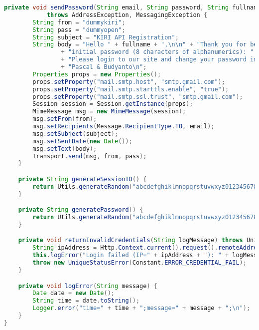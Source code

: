 \begin{lstlisting}[language=Java,basicstyle=\tiny,caption=models/AuthenticationManager.java,label={lst:authenticationmanager.java}]
	private void sendPassword(String email, String password, String fullname)
			throws AddressException, MessagingException {
		String from = "dummykiri";
		String pass = "dummyopen"; 
		String subject = "KIRI API Registration";
		String body = "Hello " + fullname + ",\n\n" + "Thank you for becoming KIRI Friends. Please find below your\n"
				+ "initial password (8 characters of alphanumerics): " + password + "\n"
				+ "Please login to our site and change your password immediately.\n\n" + "Sincerely yours,\n"
				+ "Pascal & Budyanto\n";
		Properties props = new Properties();
		props.setProperty("mail.smtp.host", "smtp.gmail.com");
		props.setProperty("mail.smtp.starttls.enable", "true");
		props.setProperty("mail.smtp.ssl.trust", "smtp.gmail.com");
		Session session = Session.getInstance(props);
		MimeMessage msg = new MimeMessage(session);
		msg.setFrom(from);
		msg.setRecipients(Message.RecipientType.TO, email);
		msg.setSubject(subject);
		msg.setSentDate(new Date());
		msg.setText(body);
		Transport.send(msg, from, pass);
	}

	private String generateSessionID() {
		return Utils.generateRandom("abcdefghiklmnopqrstuvwxyz0123456789", 16);
	}

	private String generatePassword() {
		return Utils.generateRandom("abcdefghiklmnopqrstuvwxyz0123456789", 8);
	}

	private void returnInvalidCredentials(String logMessage) throws UniqueStatusError {
		String ipAddress = Http.Context.current().request().remoteAddress();
		this.logError("Login failed (IP=" + ipAddress + "): " + logMessage);
		throw new UniqueStatusError(Constant.ERROR_CREDENTIAL_FAIL);
	}

	private void logError(String message) {
		Date date = new Date();
		String time = date.toString();
		Logger.error("time=" + time + ";message=" + message + ";\n");
	}
}
\end{lstlisting}

